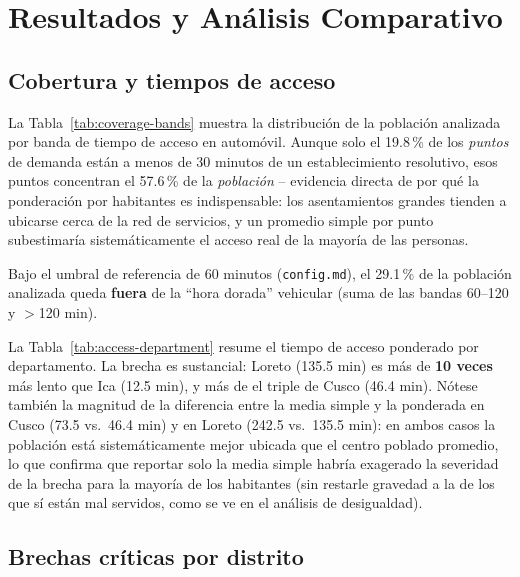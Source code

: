 \documentclass[11pt]{article}
\begin{document}
\section{Resultados y Análisis Comparativo}

\subsection{Cobertura y tiempos de acceso}

La Tabla~\ref{tab:coverage-bands} muestra la distribución de la población
analizada por banda de tiempo de acceso en automóvil. Aunque solo el
19.8\,\% de los \emph{puntos} de demanda están a menos de 30 minutos de un
establecimiento resolutivo, esos puntos concentran el 57.6\,\% de la
\emph{población} -- evidencia directa de por qué la ponderación por
habitantes es indispensable: los asentamientos grandes tienden a ubicarse
cerca de la red de servicios, y un promedio simple por punto subestimaría
sistemáticamente el acceso real de la mayoría de las personas.



Bajo el umbral de referencia de 60 minutos (\texttt{config.md}), el
29.1\,\% de la población analizada queda \textbf{fuera} de la ``hora
dorada'' vehicular (suma de las bandas 60--120 y $>$120 min).

La Tabla~\ref{tab:access-department} resume el tiempo de acceso ponderado
por departamento. La brecha es sustancial: Loreto (135.5 min) es más de
\textbf{10 veces} más lento que Ica (12.5 min), y más de el triple de
Cusco (46.4 min). Nótese también la magnitud de la diferencia entre la
media simple y la ponderada en Cusco (73.5 vs.\ 46.4 min) y en Loreto
(242.5 vs.\ 135.5 min): en ambos casos la población está sistemáticamente
mejor ubicada que el centro poblado promedio, lo que confirma que reportar
solo la media simple habría exagerado la severidad de la brecha para la
mayoría de los habitantes (sin restarle gravedad a la de los que sí están
mal servidos, como se ve en el análisis de desigualdad).



\subsection{Brechas críticas por distrito}
\end{document}
